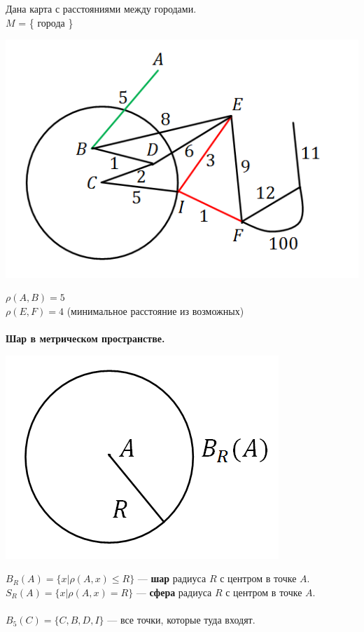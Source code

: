 \documentclass[a4paper,12pt]{article}
\begin{document}
\begin{defintion}
Дана карта с расстояниями между городами.\\
$M$ = \{ города \}\begin{center}
	\includegraphics[scale=0.7]{l4_1.png}\end{center}
$\rho (A, B) = 5$\\
$\rho (E, F) = 4$ (минимальное расстояние из возможных)\\
\\
\textbf{Шар в метрическом пространстве.}\begin{center}
	\includegraphics[scale=0.5]{l4_2.png}\end{center}
$B_R(A) = \{x | \rho(A, x) \leqslant R \}$ --- \textbf{шар} радиуса $R$ с центром в точке $A$.\\ 
$S_R(A) = \{x | \rho(A, x) = R \}$ --- \textbf{сфера} радиуса $R$ с центром в точке $A$.\\ 
\\
$B_5(C) = \{ C, B, D, I \}$ --- все точки, которые туда входят. \\

\end{defintion}
\end{document}
